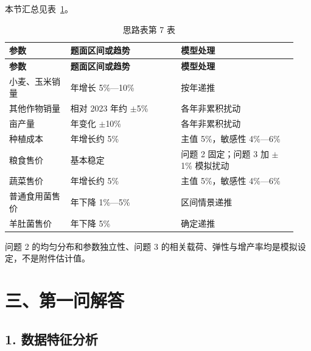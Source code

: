 \documentclass[UTF8,11pt,a4paper]{ctexart}
\begin{document}
\noindent 本节汇总见表~\ref{tab:thought-7}。
\begin{longtable}{@{}>{\raggedright\arraybackslash}p{0.20\linewidth}>{\raggedright\arraybackslash}p{0.36\linewidth}>{\raggedright\arraybackslash}p{0.38\linewidth}@{}}
\caption{思路表第 7 表}\label{tab:thought-7}\\
\toprule
\textbf{参数} & \textbf{题面区间或趋势} & \textbf{模型处理} \\
\midrule
\endfirsthead
\toprule
\textbf{参数} & \textbf{题面区间或趋势} & \textbf{模型处理} \\
\midrule
\endhead
小麦、玉米销量 & 年增长 5\%—10\% & 按年递推 \\
其他作物销量 & 相对 2023 年约 \ensuremath{\pm{}}5\% & 各年非累积扰动 \\
亩产量 & 年变化 \ensuremath{\pm{}}10\% & 各年非累积扰动 \\
种植成本 & 年增长约 5\% & 主值 5\%，敏感性 4\%—6\% \\
粮食售价 & 基本稳定 & 问题 2 固定；问题 3 加 \ensuremath{\pm{}}1\% 模拟扰动 \\
蔬菜售价 & 年增长约 5\% & 主值 5\%，敏感性 4\%—6\% \\
普通食用菌售价 & 年下降 1\%—5\% & 区间情景递推 \\
羊肚菌售价 & 年下降 5\% & 确定递推 \\
\bottomrule
\end{longtable}

问题 2 的均匀分布和参数独立性、问题 3 的相关载荷、弹性与增产率均是模拟设定，不是附件估计值。

\section{三、第一问解答}

\subsection{1. 数据特征分析}
\end{document}
